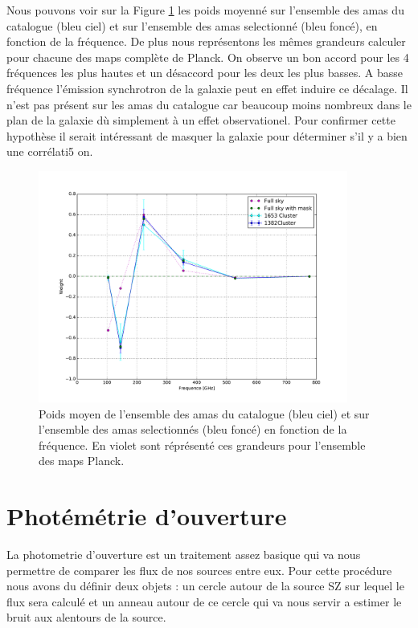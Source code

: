 \documentclass[a4paper,11pt]{article}
\begin{document}
Nous pouvons voir sur la Figure \ref{w_full} les poids moyenné sur
l'ensemble des amas du catalogue (bleu ciel) et sur l'ensemble des
amas selectionné (bleu foncé), en fonction de la fréquence. De plus
nous représentons les mêmes grandeurs calculer pour chacune des maps
complète de Planck. On observe un bon accord pour les 4 fréquences les
plus hautes et un désaccord pour les deux les plus basses. A basse
fréquence l'émission synchrotron de la galaxie peut en effet induire
ce décalage. Il n'est pas présent sur les amas du catalogue car
beaucoup moins nombreux dans le plan de la galaxie dù simplement à un
effet observationel. Pour confirmer cette hypothèse il serait
intéressant de masquer la galaxie pour déterminer s'il y a bien une
corrélati5
on.  

\begin{figure}[h!]
  \centering
  \label{w_full}
  \includegraphics[width=4in]{w_full.pdf}
  \caption{Poids moyen de l'ensemble des amas du catalogue (bleu ciel) et sur
    l'ensemble des amas selectionnés (bleu foncé) en fonction
    de la fréquence. En violet sont réprésenté ces grandeurs pour
    l'ensemble des maps Planck.}
\end{figure}
  

\section{Photémétrie d'ouverture}
La photometrie d'ouverture est un traitement assez basique qui va nous 
permettre de comparer les flux de nos sources entre eux.
Pour cette procédure nous avons du définir deux objets : un cercle autour de la source SZ
sur lequel le flux sera calculé et un anneau autour de ce cercle qui va nous servir a estimer le bruit 
aux alentours de la source.
\end{document}
